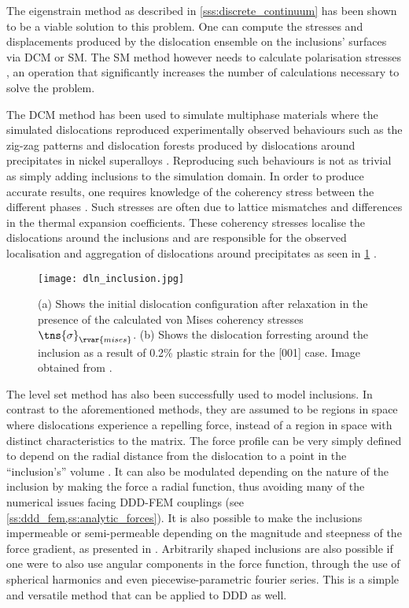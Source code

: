 The eigenstrain method \cite{eigenstrain_incl} as described in \cref{sss:discrete_continuum} has been shown to be a viable solution to this problem. One can compute the stresses and displacements produced by the dislocation ensemble on the inclusions' surfaces via DCM or SM. The SM method however needs to calculate polarisation stresses \cite{bdd}, an operation that significantly increases the number of calculations necessary to solve the problem.

The DCM method has been used to simulate multiphase materials where the simulated dislocations reproduced experimentally observed behaviours such as the zig-zag patterns and dislocation forests produced by dislocations around precipitates in nickel superalloys \cite{dcm0, dcm_incl}. Reproducing such behaviours is not as trivial as simply adding inclusions to the simulation domain. In order to produce accurate results, one requires knowledge of the coherency stress between the different phases \cite{dcm_incl}. Such stresses are often due to lattice mismatches and differences in the thermal expansion coefficients. These coherency stresses localise the dislocations around the inclusions and are responsible for the observed localisation and aggregation of dislocations around precipitates as seen in \cref{f:coherency} \cite{dcm_incl}.
\begin{figure}[t]
    \centering
    \texttt{[image: dln\_inclusion.jpg]}
    \caption[Modelling dislocation inclusion interactions with the discrete continuum model.]{(a) Shows the initial dislocation configuration after relaxation in the presence of the calculated von Mises coherency stresses $ \tns{\sigma}_{\rvar{mises}} $. (b) Shows the dislocation forresting around the inclusion as a result of 0.2\% plastic strain for the [001] case. Image obtained from \cite{dcm_incl}.}
    \label{f:coherency}
\end{figure}

The level set method has also been successfully used to model inclusions. In contrast to the aforementioned methods, they are assumed to be regions in space where dislocations experience a repelling force, instead of a region in space with distinct characteristics to the matrix. The force profile can be very simply defined to depend on the radial distance from the dislocation to a point in the ``inclusion's'' volume \cite{ddd_inclusion_as_force}. It can also be modulated depending on the nature of the inclusion by making the force a radial function, thus avoiding many of the numerical issues facing DDD-FEM couplings (see \cref{ss:ddd_fem,ss:analytic_forces}). It is also possible to make the inclusions impermeable or semi-permeable depending on the magnitude and steepness of the force gradient, as presented in \cite{ddd_inclusion_as_force}. Arbitrarily shaped inclusions are also possible if one were to also use angular components in the force function, through the use of spherical harmonics and even piecewise-parametric fourier series. This is a simple and versatile method that can be applied to DDD as well.

